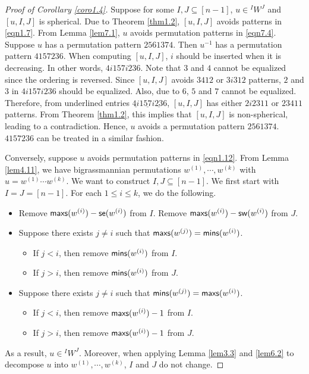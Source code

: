 \documentclass[12pt]{amsart}
\theoremstyle{definition}
\theoremstyle{remark}
\begin{document}
\begin{proof}[Proof of Corollary \ref{coro1.4}]
Suppose for some $I,J \subseteq [n-1]$, $u \in {}^I W^J$ and $[u,I,J]$ is spherical. Due to Theorem \ref{thm1.2}, $[u,I,J]$ avoids patterns in \eqref{eqn1.7}. From Lemma \ref{lem7.1}, $u$ avoids permutation patterns in \eqref{eqn7.4}. Suppose $u$ has a permutation pattern $2561374$. Then $u^{-1}$ has a permutation pattern $4157236$. When computing $[u,I,J]$, $i$ should be inserted when it is decreasing. In other words, $4i157i236$. Note that $3$ and $4$ cannot be equalized since the ordering is reversed. Since $[u,I,J]$ avoids $3412$ or $3i312$ patterns, $2$ and $3$ in $4i157i236$ should be equalized. Also, due to $6$, $5$ and $7$ cannot be equalized. Therefore, from underlined entries $\underline{4i}1\underline{57}i\underline{23}6$, $[u,I,J]$ has either $2i2311$ or $23411$ patterns. From Theorem \ref{thm1.2}, this implies that $[u,I,J]$ is non-spherical, leading to a contradiction. Hence, $u$ avoids a permutation pattern $2561374$. $4157236$ can be treated in a similar fashion.

Conversely, suppose $u$ avoids permutation patterns in \eqref{eqn1.12}. From Lemma \ref{lem4.11}, we have bigrassmannian permutations $w^{(1)} , \cdots , w^{(k)}$ with $u = w^{(1)} \cdots w^{(k)}$. We want to construct $I , J \subseteq [n-1]$. We first start with $I = J= [n-1]$. For each $1 \leq i \leq k$, we do the following.
\begin{itemize}
\item Remove ${\sf maxs}(w^{(i)}) - {\sf se}(w^{(i)})$ from $I$. Remove ${\sf maxs}(w^{(i)}) - {\sf sw}(w^{(i)})$ from $J$.
\item Suppose there exists $j \neq i$ such that ${\sf maxs}(w^{(j)}) = {\sf mins}(w^{(i)})$.
\begin{itemize}
\item If $j <i$, then remove ${\sf mins}(w^{(i)})$ from $I$.
\item If $j>i$, then remove ${\sf mins}(w^{(i)})$ from $J$.
\end{itemize}
\item Suppose there exists $j \neq i$ such that ${\sf mins}(w^{(j)}) = {\sf maxs}(w^{(i)})$.
\begin{itemize}
\item If $j <i$, then remove ${\sf maxs}(w^{(i)})-1$ from $I$.
\item If $j>i$, then remove ${\sf maxs}(w^{(i)})-1$ from $J$.
\end{itemize}
\end{itemize}
As a result, $u \in {}^I W^J$. Moreover, when applying Lemma \ref{lem3.3} and \ref{lem6.2} to decompose $u$ into $w^{(1)} , \cdots , w^{(k)}$, $I$ and $J$ do not change. 


\end{proof}
\end{document}
